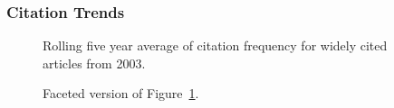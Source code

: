 \documentclass[
  10pt,
  letterpaper,
  DIV=11,
  numbers=noendperiod,
  twoside]{scrartcl}
\begin{document}
\subsubsection*{Citation Trends}\label{sec-trends-2003}

\begin{figure}


\caption{\label{fig-citation-spaghetti-2003}Rolling five year average of
citation frequency for widely cited articles from 2003.}

\end{figure}%

\begin{figure}


\caption{\label{fig-citation-facet-2003}Faceted version of
Figure~\ref{fig-citation-spaghetti-2003}.}

\end{figure}%
\end{document}

